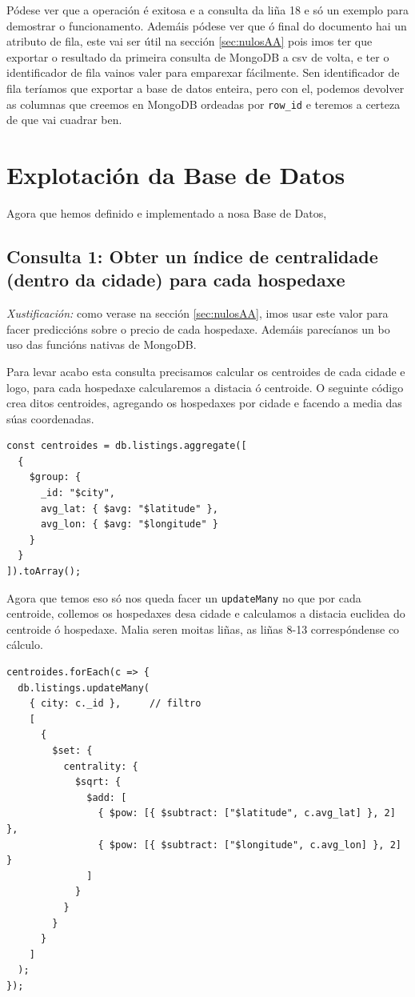 \documentclass[12pt,a4paper]{article}
\begin{document}
Pódese ver que a operación é exitosa e a consulta da liña 18 e só un exemplo para demostrar o funcionamento. Ademáis pódese ver que ó final do documento hai un atributo de fila, este vai ser útil na sección \ref{sec:nulosAA} pois imos ter que exportar o resultado da primeira consulta de MongoDB a csv de volta, e ter o identificador de fila vainos valer para emparexar fácilmente. Sen identificador de fila teríamos que exportar a base de datos enteira, pero con el, podemos devolver as columnas que creemos en MongoDB ordeadas por \texttt{row\_id} e teremos a certeza de que vai cuadrar ben.

\section{Explotación da Base de Datos}
Agora que hemos definido e implementado a nosa Base de Datos, 

\subsection*{Consulta 1: Obter un índice de centralidade (dentro da cidade) para cada hospedaxe} 
\label{consulta1}

\emph{Xustificación:} como verase na sección \ref{sec:nulosAA}, imos usar este valor para facer prediccións sobre o precio de cada hospedaxe. Ademáis parecíanos un bo uso das funcións nativas de MongoDB.

Para levar acabo esta consulta precisamos calcular os centroides de cada cidade e logo, para cada hospedaxe calcularemos a distacia ó centroide. O seguinte código crea ditos centroides, agregando os hospedaxes por cidade e facendo a media das súas coordenadas.


\begin{lstlisting}
const centroides = db.listings.aggregate([
  {
    $group: {
      _id: "$city",
      avg_lat: { $avg: "$latitude" },
      avg_lon: { $avg: "$longitude" }
    }
  }
]).toArray();
\end{lstlisting}

Agora que temos eso só nos queda facer un \texttt{updateMany} no que por cada centroide, collemos os hospedaxes desa cidade e calculamos a distacia euclidea do centroide ó hospedaxe. Malia seren moitas liñas, as liñas 8-13 correspóndense co cálculo.

\begin{lstlisting}
centroides.forEach(c => {
  db.listings.updateMany(
    { city: c._id },     // filtro
    [
      {
        $set: {
          centrality: {
            $sqrt: {
              $add: [
                { $pow: [{ $subtract: ["$latitude", c.avg_lat] }, 2] },
                { $pow: [{ $subtract: ["$longitude", c.avg_lon] }, 2] }
              ]
            }
          }
        }
      }
    ]
  );
});
\end{lstlisting}
\end{document}
